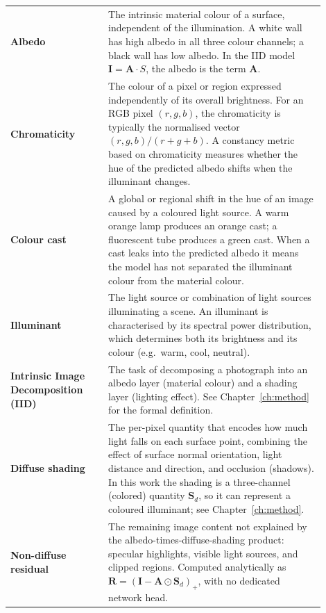 \begin{longtable}{p{0.28\linewidth} p{0.62\linewidth}}

\textbf{Albedo}
  & The intrinsic material colour of a surface, independent of the illumination.
    A white wall has high albedo in all three colour channels; a black wall has
    low albedo.  In the IID model $\mathbf{I} = \mathbf{A} \cdot S$, the albedo
    is the term $\mathbf{A}$. \\[4pt]

\textbf{Chromaticity}
  & The colour of a pixel or region expressed independently of its overall
    brightness.  For an RGB pixel $(r, g, b)$, the chromaticity is typically
    the normalised vector $(r, g, b) / (r + g + b)$.  A constancy metric
    based on chromaticity measures whether the hue of the predicted albedo
    shifts when the illuminant changes. \\[4pt]

\textbf{Colour cast}
  & A global or regional shift in the hue of an image caused by a coloured
    light source.  A warm orange lamp produces an orange cast; a fluorescent
    tube produces a green cast.  When a cast leaks into the predicted albedo
    it means the model has not separated the illuminant colour from the
    material colour. \\[4pt]

\textbf{Illuminant}
  & The light source or combination of light sources illuminating a scene.
    An illuminant is characterised by its spectral power distribution, which
    determines both its brightness and its colour (e.g.\ warm, cool, neutral). \\[4pt]

\textbf{Intrinsic Image Decomposition (IID)}
  & The task of decomposing a photograph into an albedo layer (material colour)
    and a shading layer (lighting effect).  See Chapter~\ref{ch:method} for
    the formal definition. \\[4pt]

\textbf{Diffuse shading}
  & The per-pixel quantity that encodes how much light falls on each surface
    point, combining the effect of surface normal orientation, light distance
    and direction, and occlusion (shadows).  In this work the shading is a
    three-channel (colored) quantity $\mathbf{S}_d$, so it can represent a
    coloured illuminant; see Chapter~\ref{ch:method}. \\[4pt]

\textbf{Non-diffuse residual}
  & The remaining image content not explained by the albedo-times-diffuse-shading
    product: specular highlights, visible light sources, and clipped regions.
    Computed analytically as $\mathbf{R} = (\mathbf{I} - \mathbf{A} \odot \mathbf{S}_d)_{+}$,
    with no dedicated network head. \\[4pt]


\end{longtable}
